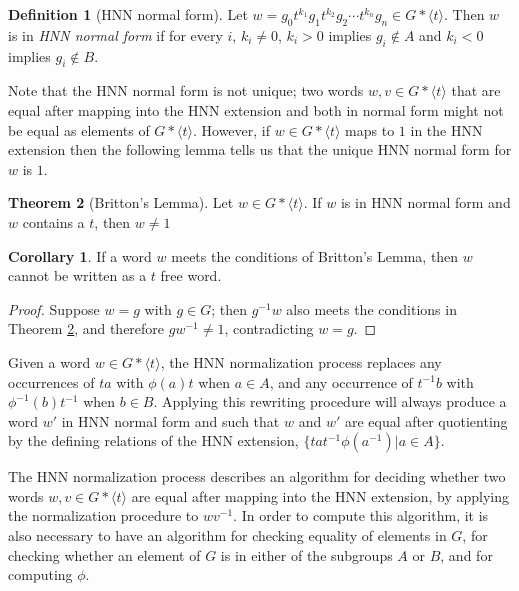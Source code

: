 \documentclass[11pt]{article} %
\theoremstyle{definition}
\newtheorem{theorem}{Theorem}[section]
\theoremstyle{definition}
\newtheorem{corol}{Corollary}[theorem]
\theoremstyle{definition}
\theoremstyle{definition}
\theoremstyle{definition}
\newtheorem{defn}[theorem]{Definition}
\theoremstyle{definition}
\begin{document}
\begin{defn}[HNN normal form]\label{HNNnormalform}
  Let $w = g_0t^{k_1}g_1t^{k_2}g_2 \cdots t^{k_n}g_n \in G \ast \langle t \rangle$.
  Then $w$ is in \textit{HNN normal form} if for every $i$, $k_i \ne 0$, $k_i > 0$
  implies $g_i \notin A$ and $k_i < 0$ implies $g_i \notin B$.
\end{defn}

Note that the HNN normal form is not unique; two words $w, v \in G \ast \langle t \rangle$
that are equal after mapping into the HNN extension and both in normal form might not be
equal as elements of $G \ast \langle t \rangle$. However, if $w \in G \ast \langle t \rangle $
maps to $1$ in the HNN extension
then the following lemma tells us that the unique HNN normal form for $w$ is $1$.

\begin{theorem}[Britton's Lemma]\label{britton}
  Let $w \in G \ast \langle t \rangle$.
  If $w$ is in HNN normal form and $w$ contains a $t$, then $w \ne 1$
  \cite{CharlesF.Miller1968OBTA}
\end{theorem}

\begin{corol}\label{genbritton}
  If a word $w$ meets the conditions of Britton's Lemma,
  then $w$ cannot be written as a $t$ free word.
\end{corol}
\begin{proof}
Suppose $w = g$ with $g \in G$;
then $g^{-1}w$ also meets the conditions
in Theorem \ref{britton}, and therefore $gw^{-1}\ne 1$, contradicting $w = g$.
\end{proof}
Given a word $w \in G \ast \langle t \rangle$, the HNN normalization process
replaces any occurrences of $ta$ with $\phi(a)t$ when $a \in A$, and
any occurrence of $t^{-1}b$ with $\phi^{-1}(b)t^{-1}$ when $b \in B$.
Applying this rewriting procedure will always produce a word $w'$ in HNN normal form and
such that $w$ and $w'$ are equal after quotienting by the defining relations
of the HNN extension, $\{ta t^{-1} \phi(a^{-1}) | a \in A\}$.

The HNN normalization process describes an algorithm for deciding
whether two words $w, v \in G \ast \langle t \rangle$ are equal
after mapping into the HNN extension, by applying the normalization procedure to
 $wv^{-1}$.
In order to compute this algorithm, it is also necessary to have an algorithm for checking equality
of elements in $G$,
for checking whether an element of $G$ is in either of the subgroups $A$ or $B$, and for computing $\phi$.
\end{document}
